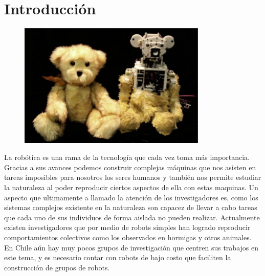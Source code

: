 
\chapter{Introducción} %

\label{Chapter1} %




\begin{figure}[htbp]
	\centering
		\includegraphics[width=0.8\textwidth]{./Figures/robot.jpg}
	\label{fig:Huggable}
\end{figure}

La robótica es una rama de la tecnología que cada vez toma más importancia. Gracias a sus avances podemos construir complejas máquinas que nos asisten en tareas imposibles para nosotros los seres humanos y también nos permite estudiar la naturaleza al poder reproducir ciertos aspectos de ella con estas maquinas. Un aspecto que ultimamente a llamado la atención de los investigadores es, como los sistemas complejos existente en la naturaleza son capacez de llevar a cabo tareas que cada uno de sus individuos de forma aislada no pueden realizar. Actualmente existen investigadores que por medio de robots simples han logrado reproducir comportamientos colectivos como los observados en hormigas y otros animales. En Chile aún hay muy pocos grupos de investigación que centren sus trabajos en este tema, y es necesario contar con robots de bajo costo que faciliten la construcción de grupos de robots.

